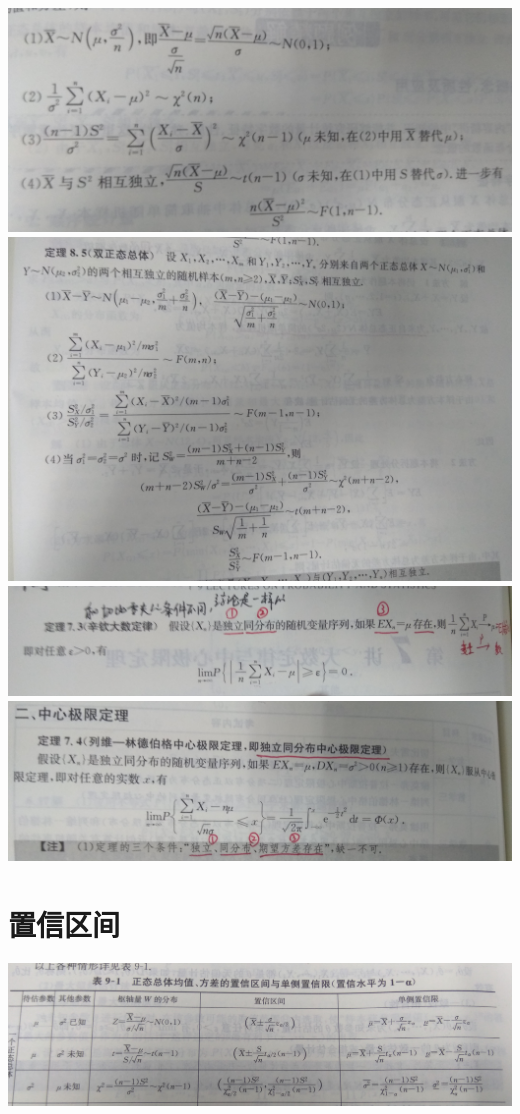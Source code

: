 \documentclass[UTF8]{ctexart}
\begin{document}
\includegraphics[width=15cm]{9345E7/danzhengtai.jpg}
\includegraphics[width=15cm]{9345E7/shuangzhengtai.jpg}
\includegraphics[width=15cm]{9345E7/xinqin.jpg}
\includegraphics[width=15cm]{9345E7/zhongxinjixian.jpg}

\section{置信区间}
\includegraphics[width=14cm]{9345E7/IMG_20180718_173505.jpg}
\end{document}

